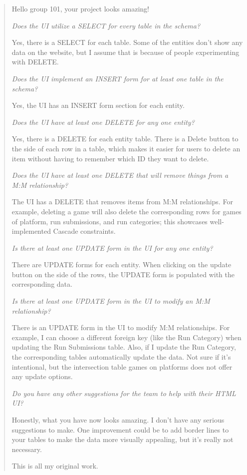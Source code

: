 \documentclass[11pt]{article}
\begin{document}
\begin{quote}
Hello group 101, your project looks amazing!

\textit{Does the UI utilize a SELECT for every table in the schema?}

Yes, there is a SELECT for each table. Some of the entities don't show any data on the website, but I assume that is because of people experimenting with DELETE.

\textit{Does the UI implement an INSERT form for at least one table in the schema?}

Yes, the UI has an INSERT form section for each entity.

\textit{Does the UI have at least one DELETE for any one entity?}

Yes, there is a DELETE for each entity table. There is a Delete button to the side of each row in a table, which makes it easier for users to delete an item without having to remember which ID they want to delete.

\textit{Does the UI have at least one DELETE that will remove things from a M:M relationship?}

The UI has a DELETE that removes items from M:M relationships. For example, deleting a game will also delete the corresponding rows for games of platform, run submissions, and run categories; this showcases well-implemented Cascade constraints.

\textit{Is there at least one UPDATE form in the UI for any one entity?}

There are UPDATE forms for each entity. When clicking on the update button on the side of the rows, the UPDATE form is populated with the corresponding data.

\textit{Is there at least one UPDATE form in the UI to modify an M:M relationship?}

There is an UPDATE form in the UI to modify M:M relationships. For example, I can choose a different foreign key (like the Run Category) when updating the Run Submissions table. Also, if I update the Run Category, the corresponding tables automatically update the data. Not sure if it's intentional, but the intersection table games on platforms does not offer any update options.

\textit{Do you have any other suggestions for the team to help with their HTML UI?}

Honestly, what you have now looks amazing. I don't have any serious suggestions to make. One improvement could be to add border lines to your tables to make the data more visually appealing, but it's really not necessary.

This is all my original work.
\end{quote}
\end{document}
